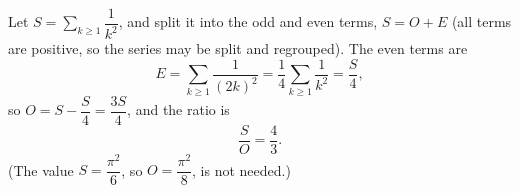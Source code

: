 Let $S=\displaystyle\sum_{k\ge1}\dfrac1{k^2}$, and split it into the odd and even terms, $S=O+E$ (all terms are positive, so the series may be split and regrouped). The even terms are
\[E=\sum_{k\ge1}\dfrac1{(2k)^2}=\dfrac14\sum_{k\ge1}\dfrac1{k^2}=\dfrac S4,\]
so $O=S-\dfrac S4=\dfrac{3S}{4}$, and the ratio is
\[\dfrac{S}{O}=\boxed{\dfrac43}.\]
(The value $S=\dfrac{\pi^2}{6}$, so $O=\dfrac{\pi^2}{8}$, is not needed.)
